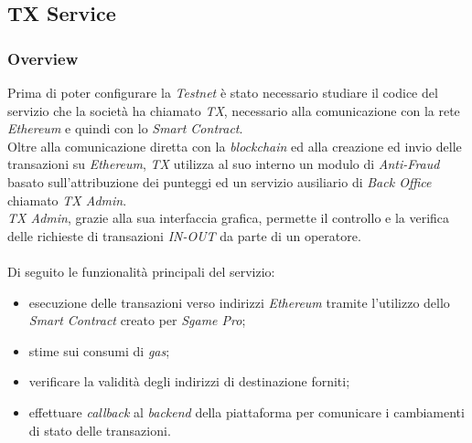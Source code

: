 \documentclass[11pt]{thesistemp}
\begin{document}
\subsection{TX Service}

\subsubsection{Overview}

Prima di poter configurare la \textit{Testnet} è stato necessario studiare il codice del servizio che la società ha chiamato \textit{TX}, necessario alla comunicazione con la rete \textit{Ethereum} e quindi con lo \textit{Smart Contract}.\\
Oltre alla comunicazione diretta con la \textit{blockchain} ed alla creazione ed invio delle transazioni su \textit{Ethereum}, \textit{TX} utilizza al suo interno un modulo di \textit{Anti-Fraud} basato sull'attribuzione dei punteggi ed un servizio ausiliario di \textit{Back Office} chiamato \textit{TX Admin}.\\
\textit{TX Admin}, grazie alla sua interfaccia grafica, permette il controllo e la verifica delle richieste di transazioni \textit{IN-OUT} da parte di un operatore.\\\\
Di seguito le funzionalità principali del servizio:
\begin{itemize}
	\item esecuzione delle transazioni verso indirizzi \textit{Ethereum} tramite l'utilizzo dello \textit{Smart Contract} creato per \textit{Sgame Pro};
	\item stime sui consumi di \textit{gas};
	\item verificare la validità degli indirizzi di destinazione forniti;
	\item effettuare \textit{callback} al \textit{backend} della piattaforma per comunicare i cambiamenti di stato delle transazioni.
\end{itemize}
\end{document}
